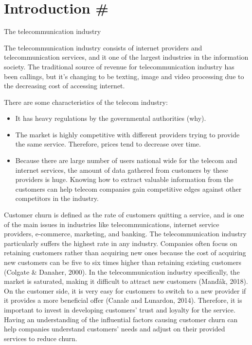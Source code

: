 
\def\mytitle{churn}
\def\myauthor{Nguyen Tam}


\part{Introduction \#}
\label{introduction}

The telecommunication industry

The telecommunication industry consists of internet providers and telecommunication services, and it one of the largest industries in the information society. The traditional source of revenue for telecommunication industry has been callings, but it's changing to be texting, image and video processing due to the decreasing cost of accessing internet.

There are some characteristics of the telecom industry:

\begin{itemize}
\item It has heavy regulations by the governmental authorities (why).

\item The market is highly competitive with different providers trying to provide the same service. Therefore, prices tend to decrease over time.

\item Because there are large number of users national wide for the telecom and internet services, the amount of data gathered from customers by these providers is huge. Knowing how to extract valuable information from the customers can help telecom companies gain competitive edges against other competitors in the industry.

\end{itemize}

Customer churn is defined as the rate of customers quitting a service, and is one of the main issues in industries like telecommunications, internet service providers, e-commerce, marketing, and banking. The telecommunication industry particularly suffers the highest rate in any industry. Companies often focus on retaining customers rather than acquiring new ones because the cost of acquiring new customers can be five to six times higher than retaining existing customers (Colgate \& Danaher, 2000). In the telecommunication industry specifically, the market is saturated, making it difficult to attract new customers (Manďák, 2018). On the customer side, it is very easy for customers to switch to a new provider if it provides a more beneficial offer (Canale and Lunardon, 2014). Therefore, it is important to invest in developing customers' trust and loyalty for the service. Having an understanding of the influential factors causing customer churn can help companies understand customers' needs and adjust on their provided services to reduce churn.

